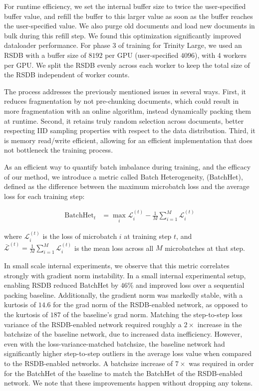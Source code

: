 \documentclass{article}
\begin{document}
For runtime efficiency, we set the internal buffer size to twice the user-specified buffer value, and refill the buffer to this larger value as soon as the buffer reaches the user-specified value. We also purge old documents and load new documents in bulk during this refill step. We found this optimization significantly improved dataloader performance. For phase 3 of training for Trinity Large, we used an RSDB with a buffer size of $8192$ per GPU (user-specified $4096$), with 4 workers per GPU. We split the RSDB evenly across each worker to keep the total size of the RSDB independent of worker counts.

The process addresses the previously mentioned issues in several ways. First, it reduces fragmentation by not pre-chunking documents, which could result in more fragmentation with an online algorithm, instead dynamically packing them at runtime. Second, it retains truly random selection across documents, better respecting IID sampling properties with respect to the data distribution. Third, it is memory read/write efficient, allowing for an efficient implementation that does not bottleneck the training process.

As an efficient way to quantify batch imbalance during training, and the efficacy of our method, we introduce a metric called Batch Heterogeneity, (BatchHet), defined as the difference between the maximum microbatch loss and the average loss for each training step:

\begin{align}
\mathrm{BatchHet}_t &= \max_{i} \mathcal{L}_i^{(t)} - \frac{1}{M} \sum_{i=1}^{M} \mathcal{L}_i^{(t)}
\tag{40}
\end{align}

where $\mathcal{L}_i^{(t)}$ is the loss of microbatch $i$ at training step $t$, and $\bar{\mathcal{L}}^{(t)} = \frac{1}{M} \sum_{i=1}^{M} \mathcal{L}_i^{(t)}$ is the mean loss across all $M$ microbatches at that step.

In small scale internal experiments, we observe that this metric correlates strongly with gradient norm instability. In a small internal experimental setup, enabling RSDB reduced BatchHet by $46\%$ and improved loss over a sequential packing baseline. Additionally, the gradient norm was markedly stable, with a kurtosis of $14.6$ for the grad norm of the RSDB-enabled network, as opposed to the kurtosis of $187$ of the baseline's grad norm. Matching the step-to-step loss variance of the RSDB-enabled network required roughly a $2\times$ increase in the batchsize of the baseline network, due to increased data inefficiency. However, even with the loss-variance-matched batchsize, the baseline network had significantly higher step-to-step outliers in the average loss value when compared to the RSDB-enabled networks. A batchsize increase of $7\times$ was required in order for the BatchHet of the baseline to match the BatchHet of the RSDB-enabled network. We note that these improvements happen without dropping any tokens.
\end{document}
